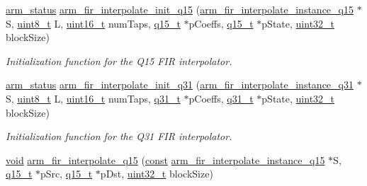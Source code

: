 \begin{DoxyCompactItemize}
\hyperlink{arm__math_8h_a5e459c6409dfcd2927bb8a57491d7cf6}{arm\-\_\-status} \hyperlink{group___f_i_r___interpolate_ga18e8c4a74ff1d0f88876cc63f675288f}{arm\-\_\-fir\-\_\-interpolate\-\_\-init\-\_\-q15} (\hyperlink{structarm__fir__interpolate__instance__q15}{arm\-\_\-fir\-\_\-interpolate\-\_\-instance\-\_\-q15} $\ast$S, \hyperlink{stdint_8h_aba7bc1797add20fe3efdf37ced1182c5}{uint8\-\_\-t} L, \hyperlink{stdint_8h_a273cf69d639a59973b6019625df33e30}{uint16\-\_\-t} num\-Taps, \hyperlink{arm__math_8h_ab5a8fb21a5b3b983d5f54f31614052ea}{q15\-\_\-t} $\ast$p\-Coeffs, \hyperlink{arm__math_8h_ab5a8fb21a5b3b983d5f54f31614052ea}{q15\-\_\-t} $\ast$p\-State, \hyperlink{stdint_8h_a435d1572bf3f880d55459d9805097f62}{uint32\-\_\-t} block\-Size)
\begin{DoxyCompactList}\small\item\em Initialization function for the Q15 F\-I\-R interpolator. \end{DoxyCompactList}\item 
\hyperlink{arm__math_8h_a5e459c6409dfcd2927bb8a57491d7cf6}{arm\-\_\-status} \hyperlink{group___f_i_r___interpolate_ga9d0ba38ce9f12a850dd242731d307476}{arm\-\_\-fir\-\_\-interpolate\-\_\-init\-\_\-q31} (\hyperlink{structarm__fir__interpolate__instance__q31}{arm\-\_\-fir\-\_\-interpolate\-\_\-instance\-\_\-q31} $\ast$S, \hyperlink{stdint_8h_aba7bc1797add20fe3efdf37ced1182c5}{uint8\-\_\-t} L, \hyperlink{stdint_8h_a273cf69d639a59973b6019625df33e30}{uint16\-\_\-t} num\-Taps, \hyperlink{arm__math_8h_adc89a3547f5324b7b3b95adec3806bc0}{q31\-\_\-t} $\ast$p\-Coeffs, \hyperlink{arm__math_8h_adc89a3547f5324b7b3b95adec3806bc0}{q31\-\_\-t} $\ast$p\-State, \hyperlink{stdint_8h_a435d1572bf3f880d55459d9805097f62}{uint32\-\_\-t} block\-Size)
\begin{DoxyCompactList}\small\item\em Initialization function for the Q31 F\-I\-R interpolator. \end{DoxyCompactList}\item 
\hyperlink{group___n_a_m_e_ga18028b8badbf1ea7e704ccac3c488e82}{void} \hyperlink{group___f_i_r___interpolate_ga7962b5f9636e54899f75d0c5936800b5}{arm\-\_\-fir\-\_\-interpolate\-\_\-q15} (\hyperlink{group___n_a_m_e_ga7ae6d0e43244213b34de2c2b9aa30da6}{const} \hyperlink{structarm__fir__interpolate__instance__q15}{arm\-\_\-fir\-\_\-interpolate\-\_\-instance\-\_\-q15} $\ast$S, \hyperlink{arm__math_8h_ab5a8fb21a5b3b983d5f54f31614052ea}{q15\-\_\-t} $\ast$p\-Src, \hyperlink{arm__math_8h_ab5a8fb21a5b3b983d5f54f31614052ea}{q15\-\_\-t} $\ast$p\-Dst, \hyperlink{stdint_8h_a435d1572bf3f880d55459d9805097f62}{uint32\-\_\-t} block\-Size)

\end{DoxyCompactItemize}
